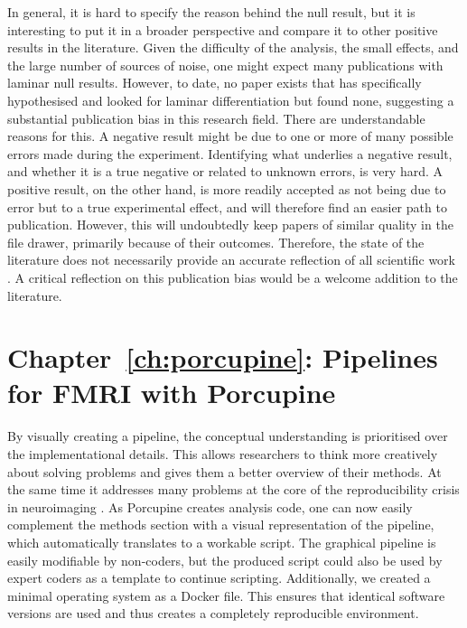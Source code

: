 In general, it is hard to specify the reason behind the null result, but it is interesting to put it in a broader perspective and compare it to other positive results in the literature. Given the difficulty of the analysis, the small effects, and the large number of sources of noise, one might expect many publications with laminar null results. However, to date, no paper exists that has specifically hypothesised and looked for laminar differentiation but found none, suggesting a substantial publication bias in this research field. There are understandable reasons for this. A negative result might be due to one or more of many possible errors made during the experiment. Identifying what underlies a negative result, and whether it is a true negative or related to unknown errors, is very hard. A positive result, on the other hand, is more readily accepted as not being due to error but to a true experimental effect, and will therefore find an easier path to publication. However, this will undoubtedly keep papers of similar quality in the file drawer, primarily because of their outcomes. Therefore, the state of the literature does not necessarily provide an accurate reflection of all scientific work \cite{Ioannidis2005,Button2013}. A critical reflection on this publication bias would be a welcome addition to the literature.

\section*{Chapter~\ref{ch:porcupine}: Pipelines for FMRI with Porcupine}
By visually creating a pipeline, the conceptual understanding is prioritised over the implementational details. This allows researchers to think more creatively about solving problems and gives them a better overview of their methods. At the same time it addresses many problems at the core of the reproducibility crisis in neuroimaging \cite{Nature2017,Munafo2017}. As Porcupine creates analysis code, one can now easily complement the methods section with a visual representation of the pipeline, which automatically translates to a workable script. The graphical pipeline is easily modifiable by non-coders, but the produced script could also be used by expert coders as a template to continue scripting. Additionally, we created a minimal operating system as a Docker file. This ensures that identical software versions are used and thus creates a completely reproducible environment.

